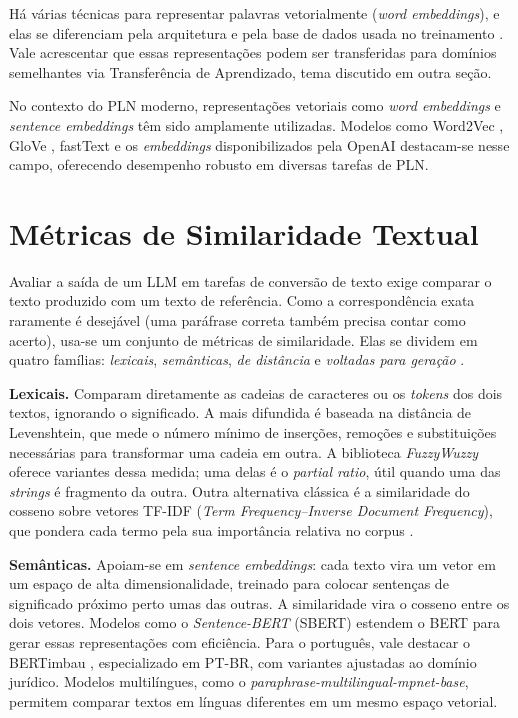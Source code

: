 Há várias técnicas para representar palavras vetorialmente (\textit{word embeddings}), e elas se diferenciam pela arquitetura e pela base de dados usada no treinamento \cite{martin2009}. Vale acrescentar que essas representações podem ser transferidas para domínios semelhantes via Transferência de Aprendizado, tema discutido em outra seção.

No contexto do PLN moderno, representações vetoriais como \textit{word embeddings} e \textit{sentence embeddings} têm sido amplamente utilizadas. Modelos como Word2Vec \cite{mikolov2013b}, GloVe \cite{pennington2014}, fastText \cite{bojanowski2017} e os \textit{embeddings} disponibilizados pela OpenAI destacam-se nesse campo, oferecendo desempenho robusto em diversas tarefas de PLN.

\section{Métricas de Similaridade Textual}

Avaliar a saída de um LLM em tarefas de conversão de texto exige comparar o texto produzido com um texto de referência. Como a correspondência exata raramente é desejável (uma paráfrase correta também precisa contar como acerto), usa-se um conjunto de métricas de similaridade. Elas se dividem em quatro famílias: \textit{lexicais}, \textit{semânticas}, \textit{de distância} e \textit{voltadas para geração} \cite{jurafsky2009}.

\textbf{Lexicais.} Comparam diretamente as cadeias de caracteres ou os \textit{tokens} dos dois textos, ignorando o significado. A mais difundida é baseada na distância de Levenshtein, que mede o número mínimo de inserções, remoções e substituições necessárias para transformar uma cadeia em outra. A biblioteca \textit{FuzzyWuzzy} oferece variantes dessa medida; uma delas é o \textit{partial ratio}, útil quando uma das \textit{strings} é fragmento da outra. Outra alternativa clássica é a similaridade do cosseno sobre vetores TF-IDF (\textit{Term Frequency--Inverse Document Frequency}), que pondera cada termo pela sua importância relativa no corpus \cite{manning2008}.

\textbf{Semânticas.} Apoiam-se em \textit{sentence embeddings}: cada texto vira um vetor em um espaço de alta dimensionalidade, treinado para colocar sentenças de significado próximo perto umas das outras. A similaridade vira o cosseno entre os dois vetores. Modelos como o \textit{Sentence-BERT} (SBERT) \cite{reimers2019} estendem o BERT para gerar essas representações com eficiência. Para o português, vale destacar o BERTimbau \cite{souza2020}, especializado em PT-BR, com variantes ajustadas ao domínio jurídico. Modelos multilíngues, como o \textit{paraphrase-multilingual-mpnet-base}, permitem comparar textos em línguas diferentes em um mesmo espaço vetorial.

